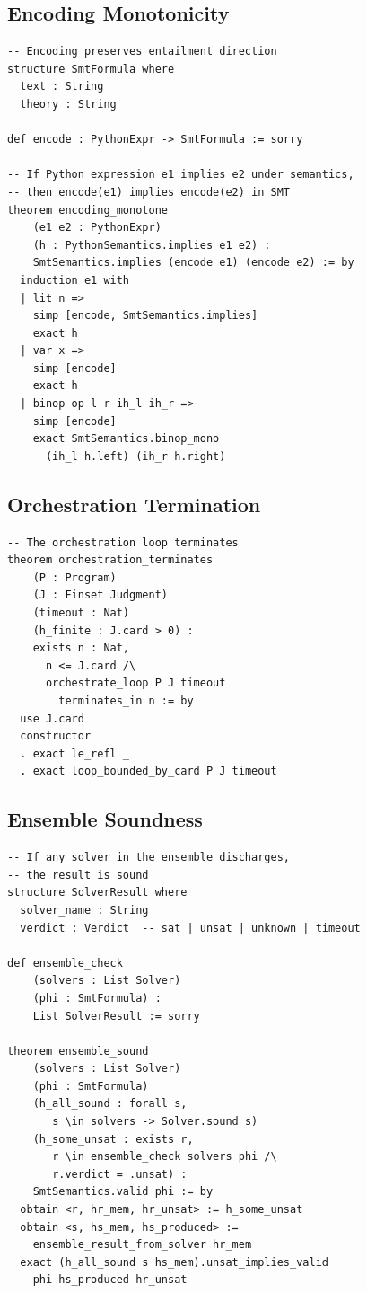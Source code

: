 \documentclass[11pt]{article}
\begin{document}
\subsection{Encoding Monotonicity}

\begin{lstlisting}[style=jugeo-output]
-- Encoding preserves entailment direction
structure SmtFormula where
  text : String
  theory : String

def encode : PythonExpr -> SmtFormula := sorry

-- If Python expression e1 implies e2 under semantics,
-- then encode(e1) implies encode(e2) in SMT
theorem encoding_monotone
    (e1 e2 : PythonExpr)
    (h : PythonSemantics.implies e1 e2) :
    SmtSemantics.implies (encode e1) (encode e2) := by
  induction e1 with
  | lit n =>
    simp [encode, SmtSemantics.implies]
    exact h
  | var x =>
    simp [encode]
    exact h
  | binop op l r ih_l ih_r =>
    simp [encode]
    exact SmtSemantics.binop_mono
      (ih_l h.left) (ih_r h.right)
\end{lstlisting}

\subsection{Orchestration Termination}

\begin{lstlisting}[style=jugeo-output]
-- The orchestration loop terminates
theorem orchestration_terminates
    (P : Program)
    (J : Finset Judgment)
    (timeout : Nat)
    (h_finite : J.card > 0) :
    exists n : Nat,
      n <= J.card /\
      orchestrate_loop P J timeout
        terminates_in n := by
  use J.card
  constructor
  . exact le_refl _
  . exact loop_bounded_by_card P J timeout
\end{lstlisting}

\subsection{Ensemble Soundness}

\begin{lstlisting}[style=jugeo-output]
-- If any solver in the ensemble discharges,
-- the result is sound
structure SolverResult where
  solver_name : String
  verdict : Verdict  -- sat | unsat | unknown | timeout

def ensemble_check
    (solvers : List Solver)
    (phi : SmtFormula) :
    List SolverResult := sorry

theorem ensemble_sound
    (solvers : List Solver)
    (phi : SmtFormula)
    (h_all_sound : forall s,
       s \in solvers -> Solver.sound s)
    (h_some_unsat : exists r,
       r \in ensemble_check solvers phi /\
       r.verdict = .unsat) :
    SmtSemantics.valid phi := by
  obtain <r, hr_mem, hr_unsat> := h_some_unsat
  obtain <s, hs_mem, hs_produced> :=
    ensemble_result_from_solver hr_mem
  exact (h_all_sound s hs_mem).unsat_implies_valid
    phi hs_produced hr_unsat
\end{lstlisting}
\end{document}
